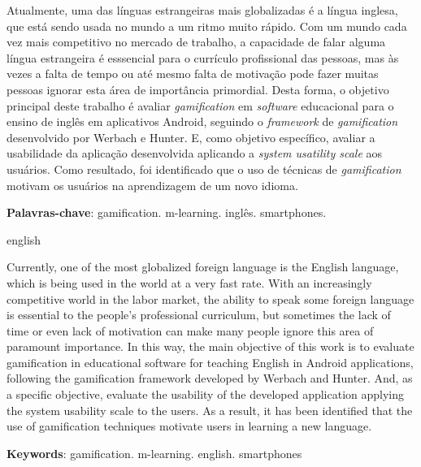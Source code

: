 \documentclass[
	12pt,				%
	openany,			%
	oneside,			%
	a4paper,			%
	english,			%
	french,				%
	spanish,			%
	brazil				%
	]{abntex2}
\begin{document}
\setlength{\absparsep}{18pt} %
\begin{resumo}


Atualmente, uma das línguas estrangeiras mais globalizadas é a língua inglesa, que está sendo usada no mundo a um ritmo muito rápido. Com um mundo cada vez mais competitivo no mercado de trabalho, a capacidade de falar alguma língua estrangeira é esssencial para o currículo profissional das pessoas, mas às vezes a falta de tempo ou até mesmo falta de motivação pode fazer muitas pessoas ignorar esta área de importância primordial. Desta forma, o objetivo principal deste trabalho é avaliar \textit{gamification} em \textit{software} educacional para o ensino de inglês em aplicativos Android, seguindo o \textit{framework} de \textit{gamification} desenvolvido por Werbach e Hunter. E, como objetivo específico, avaliar a usabilidade da aplicação desenvolvida aplicando a \textit{system usatility scale} aos usuários. Como resultado, foi identificado que o uso de técnicas de \textit{gamification} motivam os usuários na aprendizagem de um novo idioma.




 \textbf{Palavras-chave}: gamification. m-learning. inglês. smartphones.
\end{resumo}

\begin{resumo}[Abstract]
 \begin{otherlanguage*}{english}

Currently, one of the most globalized foreign language is the English language, which is being used in the world at a very fast rate. With an increasingly competitive world in the labor market, the ability to speak some foreign language is essential to the people's professional curriculum, but sometimes the lack of time or even lack of motivation can make many people ignore this area of paramount importance. In this way, the main objective of this work is to evaluate gamification in educational software for teaching English in Android applications, following the gamification framework developed by Werbach and Hunter. And, as a specific objective, evaluate the usability of the developed application applying the system usability scale to the users. As a result, it has been identified that the use of gamification techniques motivate users in learning a new language.

   \vspace{\onelineskip}
 
   \noindent 

   \textbf{Keywords}: gamification. m-learning. english. smartphones
 \end{otherlanguage*}
\end{resumo}
\end{document}
